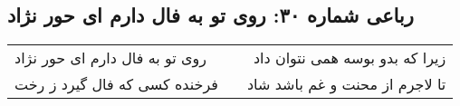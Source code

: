 \begin{center}
\section*{رباعی شماره ۳۰: روی تو به فال دارم ای حور نژاد}
\label{sec:030}
\begin{longtable}{l p{0.5cm} r}
روی تو به فال دارم ای حور نژاد
&&
زیرا که بدو بوسه همی نتوان داد
\\
فرخنده کسی که فال گیرد ز رخت
&&
تا لاجرم از محنت و غم باشد شاد
\\
\end{longtable}
\end{center}
